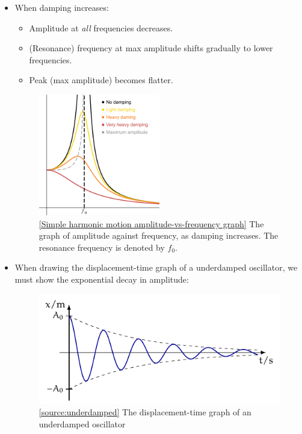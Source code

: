 \documentclass[oneside]{book}
\begin{document}
\begin{itemize}[label=\(\square\)]
    \item When damping increases:
    \begin{itemize}[label=\(\circ\)]
        \item Amplitude at \emph{all} frequencies decreases.
        \item (Resonance) frequency at max amplitude shifts gradually to lower frequencies.
        \item Peak (max amplitude) becomes flatter.
    \end{itemize}
    \begin{figure}[H]
        \centering
        \includegraphics[width=0.5\textwidth]{../images/SHM/Amplitude-vs-frequency-graph.pdf}
        \caption{\ref{Simple harmonic motion amplitude-vs-frequency graph} The graph of amplitude against frequency, as damping increases. The resonance frequency is denoted by \(f_0\).}
        \label{fig:SHM-graphs-A-f}
    \end{figure}
    \item When drawing the displacement-time graph of a underdamped oscillator, we must show the exponential decay in amplitude:
    \begin{figure}[H]
        \centering
        \includegraphics{../images/light-damping/light-damping.pdf}
        \caption{\ref{source:underdamped} The displacement-time graph of an underdamped oscillator}
        \label{fig:underdamped}
    \end{figure}
\end{itemize}
\end{document}
